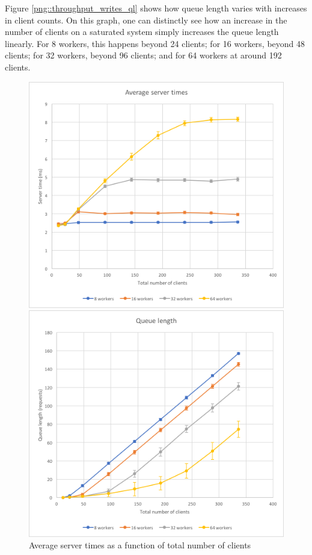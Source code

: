 \documentclass[11pt,a4paper]{article}
\begin{document}
Figure \ref{png::throughput_writes_ql} shows how queue length varies with increases in client counts. On this graph, one can distinctly see how an increase in the number of clients on a saturated system simply increases the queue length linearly. For 8 workers, this happens beyond 24 clients; for 16 workers, beyond 48 clients; for 32 workers, beyond 96 clients; and for 64 workers at around 192 clients.

\begin{figure}[!h]
    \centering
    \begin{minipage}[b]{.45\textwidth}
        \centering
        \includegraphics[width=\textwidth]{processing/graphics/throughput_writes_st.png}
        \caption{Average server times as a function of total number of clients}
        \label{png::throughput_writes_st}
    \end{minipage}
    \qquad
    \begin{minipage}[b]{.45\textwidth}
        \centering
        \includegraphics[width=\textwidth]{processing/graphics/throughput_writes_ql.png}

\end{minipage}
\end{figure}
\end{document}

